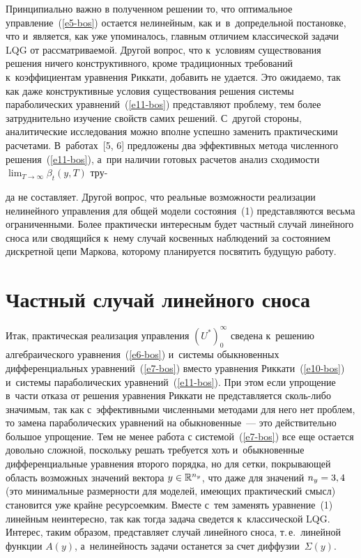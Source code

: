 \begin{multicols}{2}
     Принципиально важно в полученном решении то, что оптимальное 
управление~(\ref{e5-bos}) остается нелинейным, как и~в~допредельной 
по\-ста\-нов\-ке, что и~является, как уже упоминалось, главным отличием 
классической задачи LQG от рас\-смат\-ри\-ва\-емой. Другой вопрос, что 
к~условиям существования решения ничего конструктивного, кроме 
традиционных требований к~коэффициентам уравнения Риккати, добавить не 
удается. Это ожидаемо, так как даже конструктивные условия существования 
решения сис\-те\-мы параболических уравнений~(\ref{e11-bos}) представляют 
проб\-ле\-му, тем более затруднительно изучение свойств самих решений. 
С~другой стороны, аналитические исследования можно впол\-не успеш\-но 
заменить практическими расчетами. В~работах~[5, 6] предложены два 
эффективных метода численного решения~(\ref{e11-bos}), а~при наличии 
готовых расчетов анализ схо\-ди\-мости $\lim_{T\to\infty} \beta_t(y,T)$ тру-\linebreak\vspace*{-12pt}

\pagebreak

\noindent
  да не 
составляет. Другой вопрос, что реальные возможности реализации 
нелинейного управ\-ле\-ния для общей модели со\-сто\-яния~(1) пред\-став\-ля\-ют\-ся 
весьма ограниченными. Более практически интересным будет част\-ный 
случай линейного сноса или сводящийся к~нему случай косвенных 
наблюдений за со\-сто\-яни\-ем дискретной цепи Маркова, которому планируется 
по\-свя\-тить будущую работу.
     
\section{Частный случай линейного сноса}

     Итак, практическая реализация управ\-ле\-ния $(U^*)_0^\infty$ сведена 
к~решению алгебраического уравнения~(\ref{e6-bos}) и~сис\-те\-мы 
обыкновенных дифференциальных уравнений~(\ref{e7-bos}) вместо 
уравнения Риккати~(\ref{e10-bos}) и~сис\-те\-мы параболических  
уравнений~(\ref{e11-bos}). При этом если упро\-ще\-ние в~час\-ти отказа от 
решения уравнения Риккати не представляется сколь-ли\-бо значимым, так 
как с~эффективными численными методами для него нет проб\-лем, то замена 
параболических уравнений на обыкновенные~--- это действительно большое 
упрощение. Тем не менее работа с системой~(\ref{e7-bos}) все еще остается 
довольно слож\-ной, поскольку решать требуется хоть и~обыкновенные 
дифференциальные уравнения второго порядка, но для сетки, по\-кры\-ва\-ющей 
об\-ласть воз\-мож\-ных значений вектора $y\hm\in \mathbb{R}^{n_y}$, что даже 
для значений $n_y\hm= 3, 4$ (это минимальные раз\-мер\-но\-сти для моделей, 
име\-ющих практический смысл) становится уже крайне ресурсоемким. 
Вместе с~тем заменять уравнение~(1) линейным неинтересно, так как тогда 
задача сведется к~классической LQG. Интерес, таким образом, пред\-став\-ля\-ет 
случай линейного сноса, т.\,е.\ линейной функции $A(y)$, а~не\-ли\-ней\-ность 
задачи останется за счет диффузии~$\Sigma(y)$.
      

\end{multicols}
